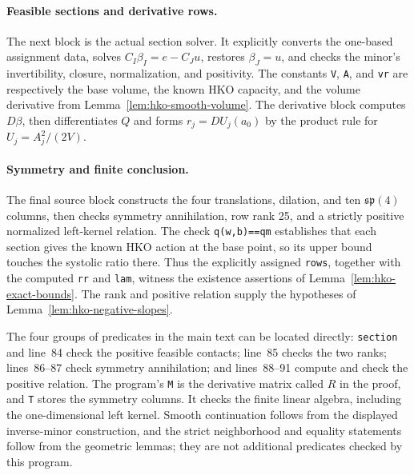 

\paragraph{Feasible sections and derivative rows.}
The next block is the actual section solver.  It explicitly converts the
one-based assignment data, solves $C_I\beta_I=e-C_Ju$, restores $\beta_J=u$,
and checks the minor's invertibility, closure, normalization, and positivity.
The constants \texttt{V}, \texttt{A}, and \texttt{vr} are respectively the base
volume, the known HKO capacity, and the volume derivative from
Lemma~\ref{lem:hko-smooth-volume}. The derivative block computes $D\beta$,
then differentiates $Q$ and forms $r_j=DU_j(a_0)$ by the product rule for
$U_j=A_j^2/(2V)$.



\paragraph{Symmetry and finite conclusion.}
The final source block constructs the four translations, dilation, and ten
$\mathfrak{sp}(4)$ columns, then checks symmetry annihilation, row rank 25,
and a strictly positive normalized left-kernel relation. The check
\texttt{q(w,b)==qm} establishes that each section gives the known HKO action
at the base point, so its upper bound touches the systolic ratio there.
Thus the explicitly assigned \texttt{rows}, together with the computed
\texttt{rr} and \texttt{lam}, witness the existence assertions of
Lemma~\ref{lem:hko-exact-bounds}. The rank and positive relation supply the
hypotheses of Lemma~\ref{lem:hko-negative-slopes}.



The four groups of predicates in the main text can be located directly:
\texttt{section} and line~84 check the positive feasible contacts;
line~85 checks the two ranks; lines~86--87 check symmetry annihilation;
and lines~88--91 compute and check the positive relation.
The program's \texttt{M} is the derivative matrix called $R$ in the proof,
and \texttt{T} stores the symmetry columns. It checks the finite linear
algebra, including the one-dimensional left kernel. Smooth continuation
follows from the displayed inverse-minor construction, and the strict
neighborhood and equality statements follow from the geometric lemmas;
they are not additional predicates checked by this program.

